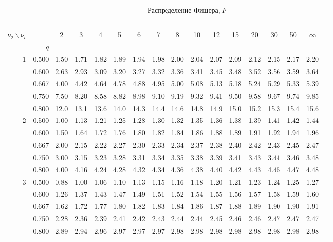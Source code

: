 {\scriptsize

\begin{center}
\begin{tabular}{rrr@{\,}r@{\,}r@{\,}r@{\,}r@{\,}r@{\,}r@{\,}r
                   @{\,}r@{\,}r@{\,}r@{\,}r@{\,}r@{\,}r@{\,}r}
&&\multicolumn{14}{c}{Распределение Фишера, $F$}\\
\ \\
$\nu_2\backslash\nu_l$ & & 
\multicolumn{1}{c}{2} &\multicolumn{1}{c}{3} &
\multicolumn{1}{c}{4} &\multicolumn{1}{c}{5} &
\multicolumn{1}{c}{6} &\multicolumn{1}{c}{7} &
\multicolumn{1}{c}{8} &\multicolumn{1}{c}{10}&
\multicolumn{1}{c}{12}&\multicolumn{1}{c}{15}&
\multicolumn{1}{c}{20}&\multicolumn{1}{c}{30}&
\multicolumn{1}{c}{50}&\multicolumn{1}{c}{$\infty$}\\
& $q$ \\
1&0.500&1.50&1.71&1.82&1.89&1.94&1.98&2.00&2.04&2.07&2.09&2.12&2.15&2.17&2.20\\
 &0.600&2.63&2.93&3.09&3.20&3.27&3.32&3.36&3.41&3.45&3.48&3.52&3.56&3.59&3.64\\
 &0.667&4.00&4.42&4.64&4.78&4.88&4.95&5.00&5.08&5.13&5.18&5.24&5.29&5.33&5.39\\
 &0.750&7.50&8.20&8.58&8.82&8.98&9.10&9.19&9.32&9.41&9.50&9.58&9.67&9.74&9.85\\
 &0.800&12.0&13.1&13.6&14.0&14.3&14.4&14.6&14.8&14.9&15.0&15.2&15.3&15.4&15.6\\
2&0.500&1.00&1.13&1.21&1.25&1.28&1.30&1.32&1.35&1.36&1.38&1.39&1.41&1.42&1.44\\
 &0.600&1.50&1.64&1.72&1.76&1.80&1.82&1.84&1.86&1.88&1.89&1.91&1.92&1.94&1.96\\
 &0.667&2.00&2.15&2.22&2.27&2.30&2.33&2.34&2.37&2.38&2.40&2.42&2.43&2.45&2.47\\
 &0.750&3.00&3.15&3.23&3.28&3.31&3.34&3.35&3.38&3.39&3.41&3.43&3.44&3.46&3.48\\
 &0.800&4.00&4.16&4.24&4.28&4.32&4.34&4.36&4.38&4.40&4.42&4.43&4.45&4.47&4.48\\
3&0.500&0.88&1.00&1.06&1.10&1.13&1.15&1.16&1.18&1.20&1.21&1.23&1.24&1.25&1.27\\
 &0.600&1.26&1.37&1.43&1.47&1.49&1.51&1.52&1.54&1.55&1.56&1.57&1.58&1.59&1.60\\
 &0.667&1.62&1.72&1.77&1.80&1.82&1.83&1.84&1.86&1.87&1.88&1.89&1.90&1.90&1.91\\
 &0.750&2.28&2.36&2.39&2.41&2.42&2.43&2.44&2.44&2.45&2.46&2.46&2.47&2.47&2.47\\
 &0.800&2.89&2.94&2.96&2.97&2.97&2.97&2.98&2.98&2.98&2.98&2.98&2.98&2.98&2.98\\

\end{tabular}
\end{center}}
